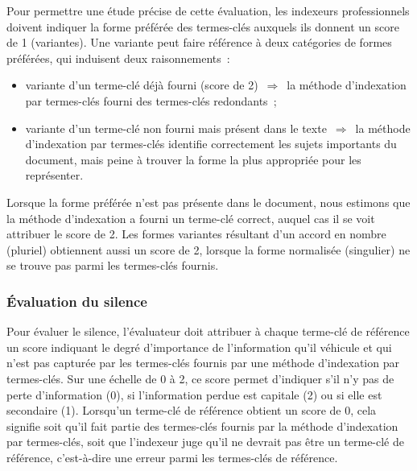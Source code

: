         Pour permettre une étude précise de cette évaluation, les indexeurs
        professionnels doivent indiquer la forme préférée des termes-clés
        auxquels ils donnent un score de 1 (variantes). Une variante peut faire
        référence à deux catégories de formes préférées, qui induisent deux
        raisonnements~:
        \begin{itemize}
          \item{variante d'un terme-clé déjà fourni (score de
                2)~$\Rightarrow$~la méthode d'indexation par termes-clés fourni
                des termes-clés redondants~; }
          \item{variante d'un terme-clé non fourni mais présent dans le
                texte~$\Rightarrow$~la méthode d'indexation par termes-clés
                identifie correctement les sujets importants du document, mais
                peine à trouver la forme la plus appropriée pour les
                représenter. }
        \end{itemize}

        Lorsque la forme préférée n'est pas présente dans le document, nous
        estimons que la méthode d'indexation a fourni un terme-clé correct,
        auquel cas il se voit attribuer le score de 2. Les formes variantes
        résultant d'un accord en nombre (pluriel) obtiennent aussi un score de
        2, lorsque la forme normalisée (singulier) ne se trouve pas parmi les
        termes-clés fournis.

      \subsubsection{Évaluation du silence}
      \label{subsubsec:main-automatic_evaluation_of_keyphrase_annotation-methodology-evaluation_protocol-silence}
        Pour évaluer le silence, l'évaluateur doit attribuer à chaque terme-clé
        de référence un score indiquant le degré d'importance de l'information
        qu'il véhicule et qui n'est pas capturée par les termes-clés fournis par
        une méthode d'indexation par termes-clés. Sur une échelle de 0 à 2, ce
        score permet d'indiquer s'il n'y pas de perte d'information (0), si
        l'information perdue est capitale (2) ou si elle est secondaire (1).
        Lorsqu'un terme-clé de référence obtient un score de 0, cela signifie
        soit qu'il fait partie des termes-clés fournis par la méthode
        d'indexation par termes-clés, soit que l'indexeur juge qu'il ne devrait
        pas être un terme-clé de référence, c'est-à-dire une erreur parmi les
        termes-clés de référence.


